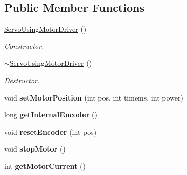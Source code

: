 \subsection*{Public Member Functions}
\begin{DoxyCompactItemize}
\item 
\mbox{\label{classServoUsingMotorDriver_acc8ccf92143efa853b83940d2d690817}} 
\hyperlink{classServoUsingMotorDriver_acc8ccf92143efa853b83940d2d690817}{Servo\+Using\+Motor\+Driver} ()
\begin{DoxyCompactList}\small\item\em Constructor. \end{DoxyCompactList}\item 
\mbox{\label{classServoUsingMotorDriver_a8aa604a17555514d3ddf78e15f467faf}} 
\hyperlink{classServoUsingMotorDriver_a8aa604a17555514d3ddf78e15f467faf}{$\sim$\+Servo\+Using\+Motor\+Driver} ()
\begin{DoxyCompactList}\small\item\em Destructor. \end{DoxyCompactList}\item 
\mbox{\label{classServoUsingMotorDriver_a9569643c48ac9d6c1936e8562825e280}} 
void {\bfseries set\+Motor\+Position} (int pos, int timems, int power)
\item 
\mbox{\label{classServoUsingMotorDriver_a64c62fd0ecb287fe45770c387e394eac}} 
long {\bfseries get\+Internal\+Encoder} ()
\item 
\mbox{\label{classServoUsingMotorDriver_acf78dbe83df0a7744fd40920a6388efd}} 
void {\bfseries reset\+Encoder} (int pos)
\item 
\mbox{\label{classServoUsingMotorDriver_a58fbf805d7bb382b505ea634e6bcbb08}} 
void {\bfseries stop\+Motor} ()
\item 
\mbox{\label{classServoUsingMotorDriver_ad76b35929d55c4249c5e7c3818c053b6}} 
int {\bfseries get\+Motor\+Current} ()
\item 
\mbox{\label{classServoUsingMotorDriver_adeb6e60d59bac919b7dc45c6f4a4f32c}} 

\end{DoxyCompactItemize}
